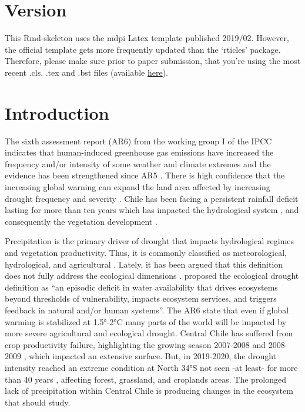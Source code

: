 \documentclass[preprint,
3p]{elsarticle} %
\begin{document}
\hypertarget{version}{%
\section{Version}\label{version}}

This Rmd-skeleton uses the mdpi Latex template published 2019/02.
However, the official template gets more frequently updated than the
`rticles' package. Therefore, please make sure prior to paper
submission, that you're using the most recent .cls, .tex and .bst files
(available \href{http://www.mdpi.com/authors/latex}{here}).

\hypertarget{introduction}{%
\section{Introduction}\label{introduction}}

The sixth assessment report (AR6) from the working group I of the IPCC
\citep{IPCC2021} indicates that human-induced greenhouse gas emissions
have increased the frequency and/or intensity of some weather and
climate extremes and the evidence has been strengthened since AR5
\citep{IPCC2013}. There is high confidence that the increasing global
warning can expand the land area affected by increasing drought
frequency and severity \citep{IPCCCH112021}. Chile has been facing a
persistent rainfall deficit lasting for more than ten years
\citep{Garreaud2017} which has impacted the hydrological system
\citep{Boisier2018}, and consequently the vegetation development
\citep{Zambrano2020}.

Precipitation is the primary driver of drought that impacts hydrological
regimes and vegetation productivity. Thus, it is commonly classified as
meteorological, hydrological, and agricultural \citep{Wilhite1985}.
Lately, it has been argued that this definition does not fully address
the ecological dimensions \citep{Crausbay2017}. \citet{Crausbay2017}
proposed the ecological drought definition as ``an episodic deficit in
water availability that drives ecosystems beyond thresholds of
vulnerability, impacts ecosystem services, and triggers feedback in
natural and/or human systems''. The AR6 \citep{IPCC2021} state that even
if global warming is stabilized at 1.5°-2°C many parts of the world will
be impacted by more severe agricultural and ecological drought. Central
Chile has suffered from crop productivity failure, highlighting the
growing season 2007-2008 and 2008-2009
\citep{Zambrano2016, Zambrano2018}, which impacted an extensive surface.
But, in 2019-2020, the drought intensity reached an extreme condition at
North 34°S not seen -at least- for more than 40 years
\citep{Zambrano2020}, affecting forest, grassland, and croplands areas.
The prolonged lack of precipitation within Central Chile is producing
changes in the ecosystem that should study.
\end{document}
